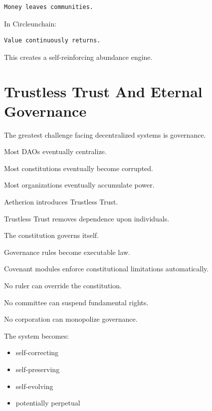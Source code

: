 ﻿\documentclass[12pt]{article}
\begin{document}
\begin{verbatim}
Money leaves communities.
\end{verbatim}

In Circleunchain:

\begin{verbatim}
Value continuously returns.
\end{verbatim}

This creates a self-reinforcing abundance engine.

\section{Trustless Trust And Eternal Governance}


The greatest challenge facing decentralized systems is governance.

Most DAOs eventually centralize.

Most constitutions eventually become corrupted.

Most organizations eventually accumulate power.

Aetherion introduces Trustless Trust.

Trustless Trust removes dependence upon individuals.

The constitution governs itself.

Governance rules become executable law.

Covenant modules enforce constitutional limitations automatically.

No ruler can override the constitution.

No committee can suspend fundamental rights.

No corporation can monopolize governance.

The system becomes:

\begin{itemize}
  \item self-correcting
\end{itemize}
\begin{itemize}
  \item self-preserving
\end{itemize}
\begin{itemize}
  \item self-evolving
\end{itemize}
\begin{itemize}
  \item potentially perpetual
\end{itemize}
\end{document}
